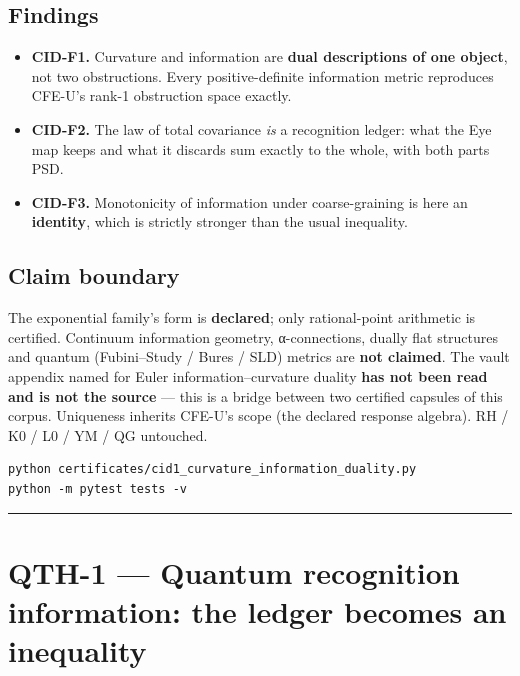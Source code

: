 \hypertarget{findings}{%
\section{Findings}\label{findings}}

\begin{itemize}
\tightlist
\item
  \textbf{CID-F1.} Curvature and information are \textbf{dual descriptions of one
  object}, not two obstructions. Every positive-definite information
  metric reproduces CFE-U's rank-1 obstruction space exactly.
\item
  \textbf{CID-F2.} The law of total covariance \emph{is} a recognition ledger:
  what the Eye map keeps and what it discards sum exactly to the whole,
  with both parts PSD.
\item
  \textbf{CID-F3.} Monotonicity of information under coarse-graining is here
  an \textbf{identity}, which is strictly stronger than the usual inequality.
\end{itemize}

\hypertarget{claim-boundary}{%
\section{Claim boundary}\label{claim-boundary}}

The exponential family's form is \textbf{declared}; only rational-point
arithmetic is certified. Continuum information geometry, α-connections,
dually flat structures and quantum (Fubini--Study / Bures / SLD) metrics
are \textbf{not claimed}. The vault appendix named for Euler
information--curvature duality \textbf{has not been read and is not the
source} --- this is a bridge between two certified capsules of this
corpus. Uniqueness inherits CFE-U's scope (the declared response
algebra). RH / K0 / L0 / YM / QG untouched.

\begin{verbatim}
python certificates/cid1_curvature_information_duality.py
python -m pytest tests -v
\end{verbatim}

\begin{center}\rule{0.5\linewidth}{0.5pt}\end{center}

\hypertarget{qth-1-quantum-recognition-information-the-ledger-becomes-an-inequality}{%
\chapter{QTH-1 --- Quantum recognition information: the ledger becomes an inequality}\label{qth-1-quantum-recognition-information-the-ledger-becomes-an-inequality}}

